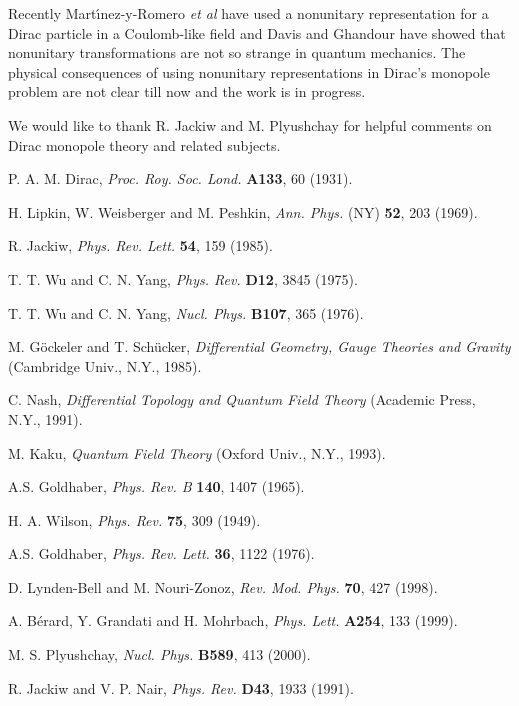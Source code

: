 \documentclass[a4paper,twocolumn,aps,showpacs,showkeys]{revtex4}
\begin{document}
Recently Mart{\'\i}nez-y-Romero {\it et al} \cite{Mar, Mar1} have
used a nonunitary representation for a Dirac particle in a
Coulomb-like field and Davis and Ghandour \cite{Dav} have showed
that nonunitary transformations are not so strange in quantum
mechanics. The physical consequences of using nonunitary
representations in Dirac's monopole problem are not clear till now
and the work is in progress.

\acknowledgments

We would like to thank R. Jackiw and M. Plyushchay for helpful
comments on Dirac monopole theory and related subjects.

\begin{thebibliography}{99}
 P. A. M. Dirac, {\it Proc. Roy. Soc. Lond.} {\bf A133}, 60 (1931).

 H. Lipkin, W. Weisberger and M. Peshkin, {\it Ann. Phys.}
(NY) {\bf 52}, 203 (1969).

 R. Jackiw, {\it Phys. Rev. Lett.} {\bf 54}, 159 (1985).

 T. T. Wu and C. N. Yang, {\it Phys. Rev.} {\bf D12}, 3845 (1975).

 T. T. Wu and C. N. Yang, {\it Nucl. Phys.} {\bf B107}, 365 (1976).

 M. G\"ockeler and T. Sch\"ucker, {\it Differential
Geometry, Gauge Theories and Gravity} (Cambridge Univ., N.Y., 1985).

 C. Nash, {\it Differential Topology and Quantum Field
Theory} (Academic Press, N.Y., 1991).

 M. Kaku, {\it Quantum Field Theory} (Oxford Univ., N.Y.,
1993).

 A.S. Goldhaber, {\it Phys. Rev. B} {\bf 140}, 1407 (1965).

 H. A. Wilson, {\it Phys. Rev.} {\bf 75}, 309 (1949).

 A.S. Goldhaber, {\it Phys. Rev. Lett.} {\bf 36}, 1122 (1976).

 D. Lynden-Bell and M. Nouri-Zonoz, {\it Rev. Mod. Phys.}
{\bf 70}, 427 (1998).

 A. B\'erard, Y. Grandati and H. Mohrbach, {\it Phys.
Lett.} {\bf A254}, 133 (1999).

 M. S. Plyushchay, {\it Nucl. Phys.} {\bf B589}, 413 (2000).

 R. Jackiw and V. P. Nair, {\it Phys. Rev.} {\bf D43}, 1933 (1991).


\end{thebibliography}
\end{document}
